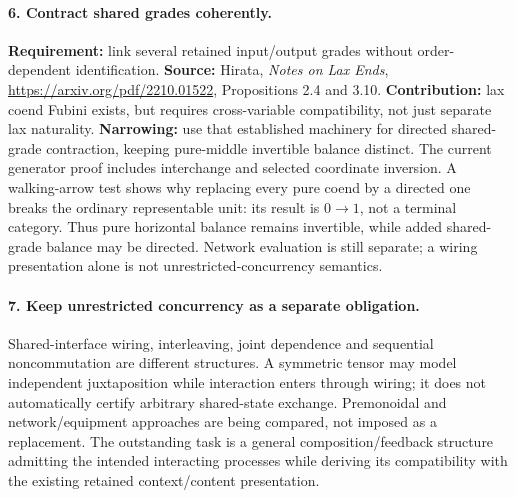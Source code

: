 \documentclass[11pt]{article}
\begin{document}
\paragraph{6. Contract shared grades coherently.}
\textbf{Requirement:} link several retained input/output grades without order-dependent identification.\newline
\textbf{Source:} Hirata, \emph{Notes on Lax Ends}, \url{https://arxiv.org/pdf/2210.01522}, Propositions 2.4 and 3.10.\newline
\textbf{Contribution:} lax coend Fubini exists, but requires cross-variable compatibility, not just separate lax naturality.\newline
\textbf{Narrowing:} use that established machinery for directed shared-grade contraction, keeping pure-middle invertible balance distinct. The current generator proof includes interchange and selected coordinate inversion. A walking-arrow test shows why replacing every pure coend by a directed one breaks the ordinary representable unit: its result is $0\to1$, not a terminal category. Thus pure horizontal balance remains invertible, while added shared-grade balance may be directed. Network evaluation is still separate; a wiring presentation alone is not unrestricted-concurrency semantics.

\paragraph{7. Keep unrestricted concurrency as a separate obligation.}
Shared-interface wiring, interleaving, joint dependence and sequential noncommutation are different structures. A symmetric tensor may model independent juxtaposition while interaction enters through wiring; it does not automatically certify arbitrary shared-state exchange. Premonoidal and network/equipment approaches are being compared, not imposed as a replacement. The outstanding task is a general composition/feedback structure admitting the intended interacting processes while deriving its compatibility with the existing retained context/content presentation.
\end{document}
